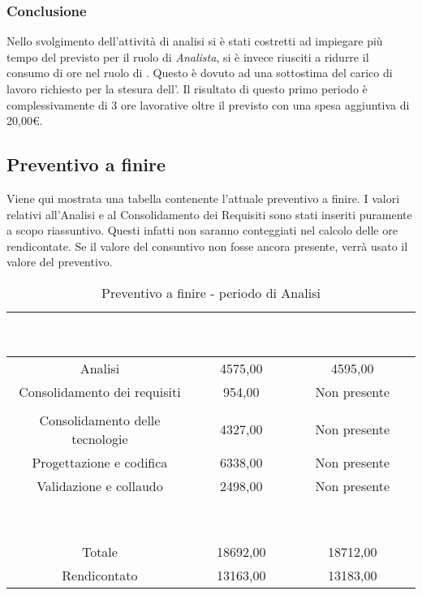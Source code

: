 \subsubsection{Conclusione}
Nello svolgimento dell'attività di analisi si è stati costretti ad impiegare più tempo del previsto per il ruolo di \textit{Analista}, si è invece riusciti a ridurre il consumo di ore nel ruolo di \Amministratore. Questo è dovuto ad una sottostima del carico di lavoro richiesto per la stesura dell'. Il risultato di questo primo periodo è complessivamente di 3 ore lavorative oltre il previsto con una spesa aggiuntiva di 20,00€.
\subsection{Preventivo a finire}
Viene qui mostrata una tabella contenente l'attuale preventivo a finire. I valori relativi all'Analisi e al Consolidamento dei Requisiti sono stati inseriti puramente a scopo riassuntivo. Questi infatti non saranno conteggiati nel calcolo delle ore rendicontate. Se il valore del consuntivo non fosse ancora presente, verrà usato il valore del preventivo.
\begin{table}[H]
	\centering
	\begin{tabular}{|c|c|c|}
	\rowcolor{darkblue} 
		\textcolor{white}{Periodo}	&\textcolor{white}{Preventivo €}	&	\textcolor{white}{Consuntivo €} \\ \hline
		Analisi					&	4575,00				&	4595,00  \\ \hline
		Consolidamento dei requisiti	&	954,00				&	Non presente  \\ \hline
		\rowcolor{darkblue} \multicolumn{3}{|c|}{\textcolor{white}{Rendicontato}}  \\ \hline
		Consolidamento delle tecnologie	&	4327,00				&	Non presente  \\ \hline
		Progettazione e codifica		&	6338,00				&	Non presente  \\ \hline
		Validazione e collaudo		&	2498,00				&	Non presente  \\ \hline
		\rowcolor{darkblue}		&\textcolor{white}{Preventivo €}	&	\textcolor{white}{Preventivo a finire €} \\ \hline
		Totale					&	18692,00				&	18712,00 \\ \hline
		Rendicontato			&	13163,00				&	13183,00 \\ \hline
	\end{tabular}
	\caption{Preventivo a finire - periodo di Analisi}
\end{table}